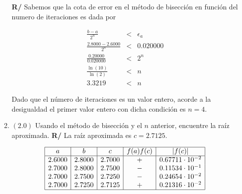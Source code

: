 \documentclass[12pt]{article}
\begin{document}
\begin{enumerate}[leftmargin=*,widest=9]
\begin{enumerate}[label=\alph*]
\textbf{R/} Sabemos que la cota de error en el método de bisección en función del numero de iteraciones es dada por 
   
   \begin{eqnarray*}
   \frac{b - a}{2^n} &<& \epsilon_a \\
   \frac{2.8000 - 2.6000}{2^n} &<& 0.020000 \\
   \frac{0.20000}{0.020000} &<& 2^n \\
   \frac{\ln(10)}{\ln(2)} &<& n \\
   3.3219 &<& n
   \end{eqnarray*}
   
   Dado que el número de iteraciones es un valor entero, acorde a la desigualdad el primer valor entero con dicha condición es \(n=4\).
   \item \((2.0)\) Usando el método de bisección y el \(n\) anterior, encuentre la raíz aproximada.
\textbf{R/} La raíz aproximada es \(c = 2.7125 \).
 
\begin{equation*}
     \begin{array}{|c|c|c|c|c|}
   \hline
   a & b & c & f(a)f(c) & |f(c)| \\
   \hline
   2.6000 & 2.8000 & 2.7000 & + & 0.67711 \cdot 10^{-2} \\
   2.7000 & 2.8000 & 2.7500 & - & 0.11534 \cdot 10^{-1} \\
   2.7000 & 2.7500 & 2.7250 & - & 0.24654 \cdot 10^{-2} \\
   2.7000 & 2.7250 & 2.7125 & + & 0.21316 \cdot 10^{-2} \\
   \hline
   \end{array}
\end{equation*}   
    \end{enumerate}
    
  \end{enumerate}
\end{document}
